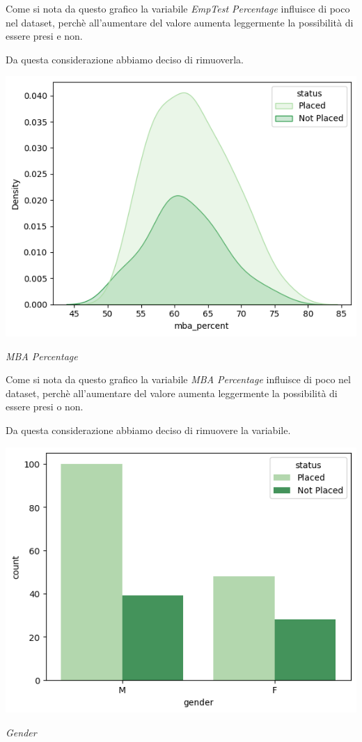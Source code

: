 \documentclass[12pt]{article}
\begin{document}
Come si nota da questo grafico la variabile \textit{EmpTest Percentage} influisce di poco nel dataset, perchè all'aumentare del valore aumenta leggermente la possibilità
di essere presi e non.

Da questa considerazione abbiamo deciso di rimuoverla.

\begin{center}
    \includegraphics[scale=0.5]{mbapercentage.png}

    \textit{MBA Percentage}
\end{center}

Come si nota da questo grafico la variabile \textit{MBA Percentage} influisce di poco nel dataset, perchè all'aumentare del valore aumenta leggermente la possibilità di essere presi o non.

Da questa considerazione abbiamo deciso di rimuovere la variabile.

\begin{center}
    \includegraphics[scale=0.5]{gender.png}

    \textit{Gender}
\end{center}
\end{document}
